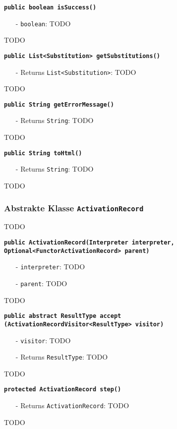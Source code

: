 \documentclass[parskip=full,11pt,twoside]{scrartcl}
\begin{document}
\textbf{\texttt{public boolean isSuccess()}}
\begin{itemize}[noitemsep]
	\item[-] \texttt{boolean}: TODO
\end{itemize}
TODO

\textbf{\texttt{public List<Substitution> getSubstitutions()}}
\begin{itemize}[noitemsep]
	\item[-] Returns \texttt{List<Substitution>}: TODO
\end{itemize}
TODO

\textbf{\texttt{public String getErrorMessage()}}
\begin{itemize}[noitemsep]
	\item[-] Returns \texttt{String}: TODO
\end{itemize}
TODO

\textbf{\texttt{public String toHtml()}}
\begin{itemize}[noitemsep]
	\item[-] Returns \texttt{String}: TODO
\end{itemize}
TODO

\subsubsection{Abstrakte Klasse \texttt{ActivationRecord}}
TODO

\textbf{\texttt{public ActivationRecord(Interpreter interpreter,\\Optional<FunctorActivationRecord> parent)}}
\begin{itemize}[noitemsep]
	\item[-] \texttt{interpreter}: TODO
	\item[-] \texttt{parent}: TODO
\end{itemize}
TODO

\textbf{\texttt{public abstract ResultType accept\\(ActivationRecordVisitor<ResultType> visitor)}}
\begin{itemize}[noitemsep]
	\item[-] \texttt{visitor}: TODO
	\item[-] Returns \texttt{ResultType}: TODO
\end{itemize}
TODO

\textbf{\texttt{protected ActivationRecord step()}}
\begin{itemize}[noitemsep]
	\item[-] Returns \texttt{ActivationRecord}: TODO
\end{itemize}
TODO
\end{document}
